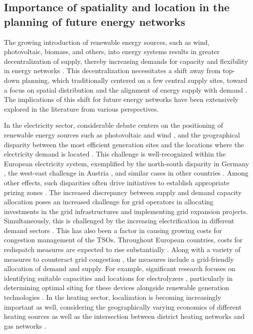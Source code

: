 \documentclass[final,10pt]{elsarticle}
\begin{document}
    \subsection{Importance of spatiality and location in the planning of future energy networks}
         The growing introduction of renewable energy sources, such as wind, photovoltaic, biomass, and others, into energy systems results in greater decentralization of supply, thereby increasing demands for capacity and flexibility in energy networks \cite{yaqoot2016review}. This decentralization necessitates a shift away from top-down planning, which traditionally centered on a few central supply sites, toward a focus on spatial distribution and the alignment of energy supply with demand \cite{liu2019development}. The implications of this shift for future energy networks have been extensively explored in the literature from various perspectives.

        In the electricity sector, considerable debate centers on the positioning of renewable energy sources such as photovoltaic and wind \cite{zappa2018analysing}, and the geographical disparity between the most efficient generation sites and the locations where the electricity demand is located \cite{nielsen2023renewable}. This challenge is well-recognized within the European electricity system, exemplified by the north-south disparity in Germany \cite{schroeder2013integration, wolf2016regional, kunz2018quo, kemfert2016welfare}, the west-east challenge in Austria \cite{LOSCHAN2023108802, burgholzer2016cost, gaugl2023integrated}, and similar cases in other countries \cite{schlachtberger2017benefits, janda2017influence}.  Among other effects, such disparities often drive initiatives to establish appropriate prizing zones \cite{trepper2015market}. The increased discrepancy between supply and demand capacity allocation poses an increased challenge for grid operators in allocating investments in the grid infrastructures and implementing grid expansion projects. Simultaneously, this is challenged by the increasing electrification in different demand sectors \cite{Auer2020}. This has also been a factor in causing growing costs for congestion management of the \aclp{TSO}. Throughout European countries, costs for redispatch measures are expected to rise substantially \cite{7981959}. Along with a variety of measures to counteract grid congestion \cite{8571791, BAUKNECHT2024107363}, the measures include a grid-friendly allocation of demand and supply. For example, significant research focuses on identifying suitable capacities and locations for electrolyzers \cite{vom2022integrating}, particularly in determining optimal siting for these devices alongside renewable generation technologies \cite{xiong2021spatial, luth2023connect,luth2024electrolysis}. In the heating sector, localization is becoming increasingly important as well, considering the geographically varying economics of different heating sources as well as the intersection between district heating networks and gas networks \cite{averfalk2020economic, zwickl2024modeling, paardekooper2022heat}.
    
\end{document}
